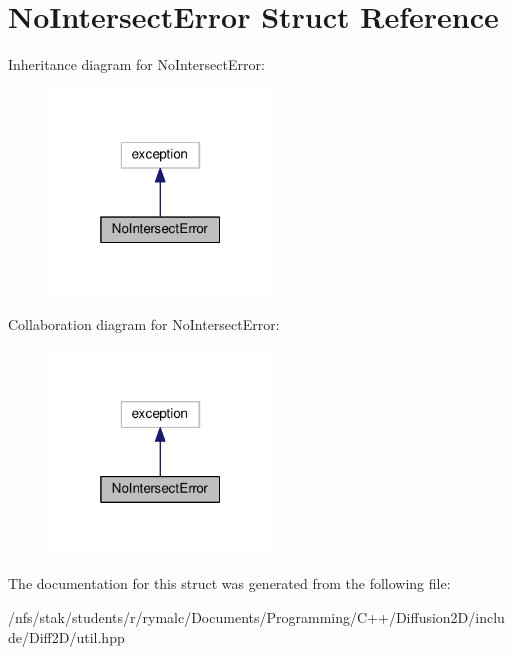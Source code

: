 \hypertarget{structNoIntersectError}{\section{No\+Intersect\+Error Struct Reference}
\label{structNoIntersectError}
}


Inheritance diagram for No\+Intersect\+Error\+:\nopagebreak
\begin{figure}[H]
\begin{center}
\leavevmode
\includegraphics[width=169pt]{structNoIntersectError__inherit__graph}
\end{center}
\end{figure}


Collaboration diagram for No\+Intersect\+Error\+:\nopagebreak
\begin{figure}[H]
\begin{center}
\leavevmode
\includegraphics[width=169pt]{structNoIntersectError__coll__graph}
\end{center}
\end{figure}


The documentation for this struct was generated from the following file\+:\begin{DoxyCompactItemize}
\item 
/nfs/stak/students/r/rymalc/\+Documents/\+Programming/\+C++/\+Diffusion2\+D/include/\+Diff2\+D/util.\+hpp\end{DoxyCompactItemize}
